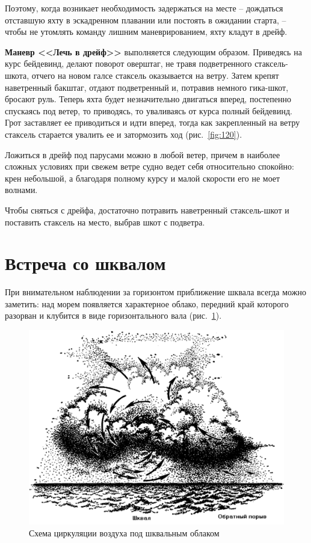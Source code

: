 \documentclass[a4paper, 12pt, twoside, final]{scrbook}
\begin{document}
Поэтому, когда возникает необходимость задержаться на месте \--- дождаться отставшую яхту в эскадренном плавании или постоять в ожидании старта, \--- чтобы не утомлять команду лишним маневрированием, яхту кладут в дрейф.

\textbf{Маневр <<Лечь в дрейф>>} выполняется следующим образом. Приведясь на курс бейдевинд, делают поворот оверштаг, не травя подветренного стаксель-шкота, отчего на новом галсе стаксель оказывается на ветру. Затем крепят наветренный бакштаг, отдают подветренный и, потравив немного гика-шкот, бросают руль. Теперь яхта будет незначительно двигаться вперед, постепенно спускаясь под ветер, то приводясь, то уваливаясь от курса полный бейдевинд. Грот заставляет ее приводиться и идти вперед, тогда как закрепленный на ветру стаксель старается увалить ее и затормозить ход (рис.~\ref{fig:120}).

Ложиться в дрейф под парусами можно в любой ветер, причем в наиболее сложных условиях при свежем ветре судно ведет себя относительно спокойно: крен небольшой, а благодаря полному курсу и малой скорости его не моет волнами.

Чтобы сняться с дрейфа, достаточно потравить наветренный стаксель-шкот и поставить стаксель на место, выбрав шкот с подветра.

\section{Встреча со шквалом}

При внимательном наблюдении за горизонтом приближение шквала всегда можно заметить: над морем появляется характерное облако, передний край которого разорван и клубится в виде горизонтального вала (рис.~\ref{fig:121}).

\begin{figure}[htbp]
   \centering
   \includegraphics{121_Shema_circ_vozd} %
   \caption{Схема циркуляции воздуха под шквальным облаком}
   \label{fig:121}
\end{figure}
\end{document}
